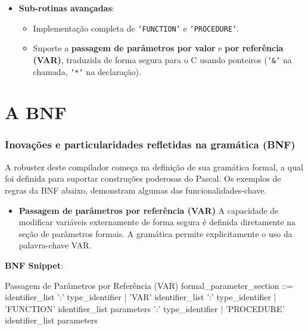 \documentclass[
	11pt,
	aspectratio=169,
]{beamer}
\begin{document}
\begin{frame}
  \begin{itemize}
    \item \textbf{Sub-rotinas avançadas}:
      \begin{itemize}
        \item Implementação completa de \texttt{`FUNCTION`} e \texttt{`PROCEDURE`}.
        \item Suporte a \textbf{passagem de parâmetros por valor} e \textbf{por referência (VAR)}, traduzida de forma segura
          para o C usando ponteiros (\texttt{`\&`} na chamada, \texttt{`*`} na declaração).
      \end{itemize}
  \end{itemize}
\end{frame}

\section{A BNF}
\begin{frame}
  \frametitle{Inovações e particularidades refletidas na gramática (BNF)}
  
  A robustez deste compilador começa na definição de sua gramática formal, a qual foi definida para suportar construções poderosas
  do Pascal. Os exemplos de regras da BNF abaixo, demonstram algumas das funcionalidades-chave.

  \begin{itemize}
    \item \textbf{Passagem de parâmetros por referência (VAR)}
      A capacidade de modificar variáveis externamente de forma segura é definida diretamente na seção de parâmetros formais. A gramática permite explicitamente o uso da palavra-chave VAR.
  \end{itemize}
\end{frame}

  \begin{frame}[fragile]
      \textbf{BNF Snippet}:
        \begin{caixaCodigoDracula}{Passagem de Parâmetros por Referência (VAR)}
formal_parameter_section ::= identifier_list ':' type_identifier
                           | 'VAR' identifier_list ':' type_identifier
                           | 'FUNCTION' identifier_list parameters ':' type_identifier
                           | 'PROCEDURE' identifier_list parameters
      \end{caixaCodigoDracula}
  \end{frame}
\end{document}
